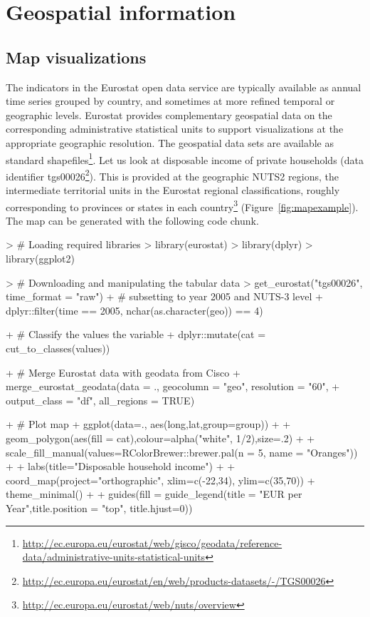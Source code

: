 \section{Geospatial information}

\subsection{Map visualizations}

The indicators in the Eurostat open data service are typically
available as annual time series grouped by country, and sometimes at
more refined temporal or geographic levels. Eurostat provides
complementary geospatial data on the corresponding administrative
statistical units to support visualizations at the appropriate
geographic resolution. The geospatial data sets are available as
standard
shapefiles\footnote{\url{http://ec.europa.eu/eurostat/web/gisco/geodata/reference-data/administrative-units-statistical-units}}. Let
us look at disposable income of private households (data identifier
tgs00026\footnote{\url{http://ec.europa.eu/eurostat/en/web/products-datasets/-/TGS00026}}). This
is provided at the geographic NUTS2 regions, the intermediate
territorial units in the Eurostat regional classifications, roughly
corresponding to provinces or states in each
country\footnote{\url{http://ec.europa.eu/eurostat/web/nuts/overview}} (Figure~\ref{fig:mapexample}). The map can be generated with the following code chunk.

\begin{example}
> # Loading required libraries
> library(eurostat)
> library(dplyr)
> library(ggplot2)

> # Downloading and manipulating the tabular data
> get_eurostat("tgs00026", time_format = "raw") %
+   # subsetting to year 2005 and NUTS-3 level
+   dplyr::filter(time == 2005, nchar(as.character(geo)) == 4) %

+   # Classify the values the variable
+   dplyr::mutate(cat = cut_to_classes(values)) %

+   # Merge Eurostat data with geodata from Cisco
+   merge_eurostat_geodata(data = ., geocolumn = "geo", resolution = "60",
+                          output_class = "df", all_regions = TRUE) %

+   # Plot map
+   ggplot(data=., aes(long,lat,group=group)) +
+   geom_polygon(aes(fill = cat),colour=alpha("white", 1/2),size=.2) +
+   scale_fill_manual(values=RColorBrewer::brewer.pal(n = 5, name = "Oranges")) +
+   labs(title="Disposable household income") +
+   coord_map(project="orthographic", xlim=c(-22,34), ylim=c(35,70)) + theme_minimal() +
+   guides(fill = guide_legend(title = "EUR per Year",title.position = "top", title.hjust=0))
\end{example}


